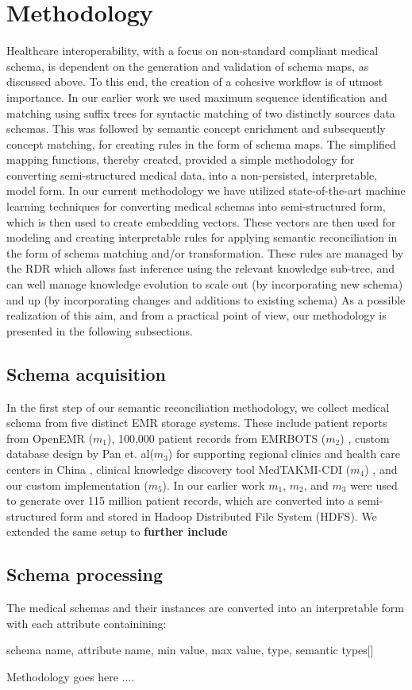 
\section*{Methodology}
\label{methodology}
Healthcare interoperability, with a focus on non-standard compliant medical schema, is dependent on the generation and validation of schema maps, as discussed above. To this end, the creation of a cohesive workflow is of utmost importance. In our earlier work \cite{Satti2020} we used maximum sequence identification and matching using suffix trees for syntactic matching of two distinctly sources data schemas. This was followed by semantic concept enrichment and subsequently concept matching, for creating rules in the form of schema maps. The simplified mapping functions, thereby created, provided a simple methodology for converting semi-structured medical data, into a non-persisted, interpretable, model form.
In our current methodology we have utilized state-of-the-art machine learning techniques for converting medical schemas into semi-structured form, which is then used to create embedding vectors. These vectors are then used for modeling and creating interpretable rules for applying semantic reconciliation in the form of schema matching and/or transformation. These rules are managed by the RDR which allows fast inference using the relevant knowledge sub-tree, and can well manage knowledge evolution to scale out (by incorporating new schema) and up (by incorporating changes and additions to existing schema)
As a possible realization of this aim, and from a practical point of view, our methodology is presented in the following subsections.

\subsection*{Schema acquisition}
\label{schema_acq}
In the first step of our semantic reconciliation methodology, we collect medical schema from five distinct EMR storage systems. These include patient reports from OpenEMR ($m_1$), 100,000 patient records from EMRBOTS ($m_2$) \cite{kartoun2016methodology}, custom database design by Pan et. al($m_3$) for supporting regional clinics and health care centers in China \cite{pan2016design}, clinical knowledge discovery tool MedTAKMI-CDI ($m_4$) \cite{inokuchi2007medtakmi}, and our custom implementation ($m_5$).
In our earlier work \cite{Satti2020} $m_1$, $m_2$, and $m_3$ were used to generate over 115 million patient records, which are converted into a semi-structured form and stored in Hadoop Distributed File System (HDFS). We extended the same setup to \textbf{further include}



\subsection*{Schema processing}
\label{schema_prepro}
The medical schemas and their instances are converted into an interpretable form with each attribute containining:

schema name, attribute name, min value, max value, type, semantic types[]



Methodology goes here ....